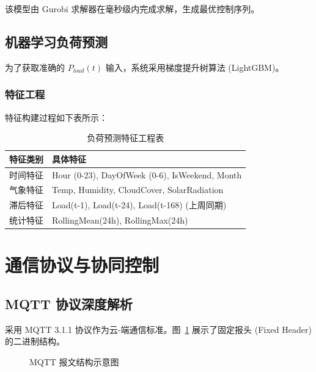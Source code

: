 该模型由 Gurobi 求解器在毫秒级内完成求解，生成最优控制序列。

\subsection{机器学习负荷预测}
为了获取准确的 $P_{load}(t)$ 输入，系统采用梯度提升树算法 (LightGBM)。

\subsubsection{特征工程}
特征构建过程如下表所示：

\begin{table}[htbp]
    \centering
    \caption{负荷预测特征工程表}
    \begin{tabular}{|l|l|}
        \hline
        \textbf{特征类别} & \textbf{具体特征}                                  \\ \hline
        时间特征          & Hour (0-23), DayOfWeek (0-6), IsWeekend, Month \\ \hline
        气象特征          & Temp, Humidity, CloudCover, SolarRadiation     \\ \hline
        滞后特征          & Load(t-1), Load(t-24), Load(t-168) (上周同期)      \\ \hline
        统计特征          & RollingMean(24h), RollingMax(24h)              \\ \hline
    \end{tabular}
\end{table}

\section{通信协议与协同控制}

\subsection{MQTT 协议深度解析}
采用 MQTT 3.1.1 协议作为云-端通信标准。图~\ref{fig:mqtt_packet} 展示了固定报头 (Fixed Header) 的二进制结构。

\begin{figure}[htbp]
    \centering
    \caption{MQTT 报文结构示意图}
    \label{fig:mqtt_packet}
\end{figure}

